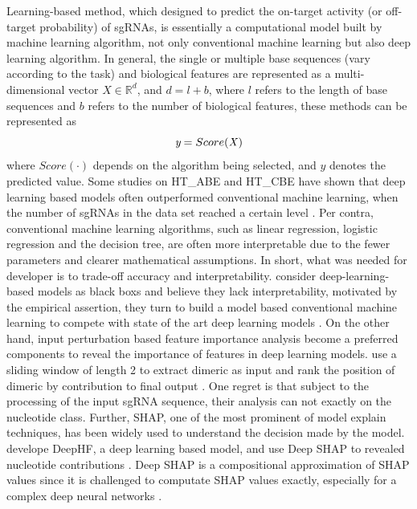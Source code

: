 \documentclass{bioinfo}
\begin{document}
Learning-based method, which designed to predict the on-target activity (or off-target probability) of sgRNAs, 
 is essentially a computational model built by machine learning algorithm, not only conventional machine learning but also deep learning algorithm. 
 In general, the single or multiple base sequences (vary according to the task) and biological features are represented as a multi-dimensional vector $X\in\mathbb{R}^d$, 
 and $d=l+b$, where $l$ refers to the length of base sequences and $b$ refers to the number of biological features, these methods can be represented as
\begin{equation}
\text{\it y}=Score(\it X)\label{eq:01}
\end{equation}
 where $Score(\cdot)$ depends on the algorithm being selected, and $y$ denotes the predicted value.
 Some studies on HT\_ABE and HT\_CBE have shown that deep learning based models often outperformed conventional machine learning, when the number of sgRNAs in the data set reached a certain level \citep{Song2020,kim2018deep,kim2019spcas9}. 
 Per contra, conventional machine learning algorithms, such as linear regression, logistic regression and the decision tree, are often more interpretable due to the fewer parameters and clearer mathematical assumptions. 
 In short, what was needed for developer is to trade-off accuracy and interpretability. 
 \citeauthor{MuhammadRafid2020} consider deep-learning-based models as black boxs and believe they lack interpretability, 
 motivated by the empirical assertion, they turn to build a model based conventional machine learning to compete with state of the art deep learning models \citep{MuhammadRafid2020}. 
 On the other hand, input perturbation based feature importance analysis become a preferred components to reveal the importance of features in deep learning models. 
 \citeauthor{Liu2019} use a sliding window of length 2 to extract dimeric as input and rank the position of dimeric by contribution to final output \citep{Liu2019}. 
 One regret is that subject to the processing of the input sgRNA sequence, their analysis can not exactly on the nucleotide class. 
 Further, SHAP, one of the most prominent of model explain techniques, has been widely used to understand the decision made by the model. 
 \citeauthor{wang2019optimized} develope DeepHF, a deep learning based model, and use Deep SHAP to revealed nucleotide contributions \citep{wang2019optimized}. 
 Deep SHAP is a compositional approximation of SHAP values since it is challenged to computate SHAP values exactly, especially for a complex deep neural networks \citep{lundberg2017a}. 
\end{document}
